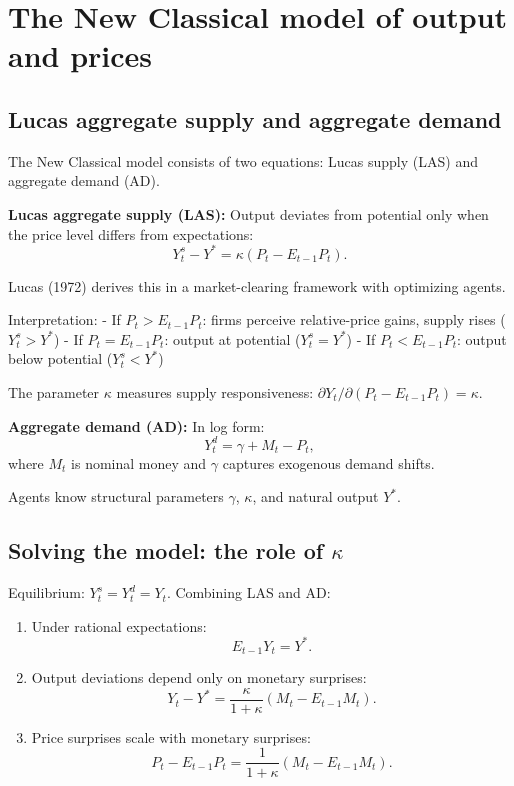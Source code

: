 \documentclass[
  letterpaper,
  DIV=11,
  numbers=noendperiod]{scrartcl}
\begin{document}
\section{The New Classical model of output and
prices}\label{the-new-classical-model-of-output-and-prices-1}

\subsection{Lucas aggregate supply and aggregate
demand}\label{lucas-aggregate-supply-and-aggregate-demand-1}

The New Classical model consists of two equations: Lucas supply (LAS)
and aggregate demand (AD).

\textbf{Lucas aggregate supply (LAS):} Output deviates from potential
only when the price level differs from expectations:
\[Y_t^s - Y^* = \kappa(P_t - E_{t-1}P_t).\]

Lucas (1972) derives this in a market-clearing framework with optimizing
agents.

Interpretation: - If \(P_t > E_{t-1}P_t\): firms perceive relative-price
gains, supply rises (\(Y_t^s > Y^*\)) - If \(P_t = E_{t-1}P_t\): output
at potential (\(Y_t^s = Y^*\)) - If \(P_t < E_{t-1}P_t\): output below
potential (\(Y_t^s < Y^*\))

The parameter \(\kappa\) measures supply responsiveness:
\(\partial Y_t / \partial(P_t - E_{t-1}P_t) = \kappa\).

\textbf{Aggregate demand (AD):} In log form:
\[Y_t^d = \gamma + M_t - P_t,\] where \(M_t\) is nominal money and
\(\gamma\) captures exogenous demand shifts.

Agents know structural parameters \(\gamma\), \(\kappa\), and natural
output \(Y^*\).

\subsection{\texorpdfstring{Solving the model: the role of
\(\kappa\)}{Solving the model: the role of \textbackslash kappa}}\label{solving-the-model-the-role-of-kappa-1}

Equilibrium: \(Y_t^s = Y_t^d = Y_t\). Combining LAS and AD:

\begin{enumerate}
\def\labelenumi{\arabic{enumi}.}
\item
  Under rational expectations: \[E_{t-1}Y_t = Y^*.\]
\item
  Output deviations depend only on monetary surprises:
  \[Y_t - Y^* = \frac{\kappa}{1+\kappa}(M_t - E_{t-1}M_t).\]
\item
  Price surprises scale with monetary surprises:
  \[P_t - E_{t-1}P_t = \frac{1}{1+\kappa}(M_t - E_{t-1}M_t).\]
\end{enumerate}
\end{document}
